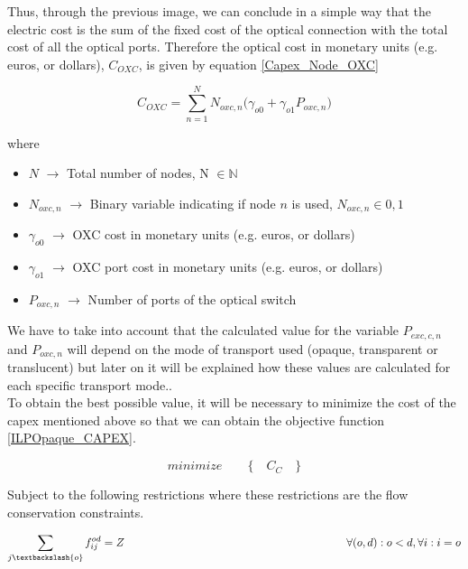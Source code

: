 Thus, through the previous image, we can conclude in a simple way that the electric cost is the sum of the fixed cost of the optical connection with the total cost of all the optical ports.
Therefore the optical cost in monetary units (e.g. euros, or dollars), $C_{OXC}$, is given by equation \ref{Capex_Node_OXC}

\begin{equation}
C_{OXC} = \sum_{n=1}^{N} N_{oxc,n} \bigg( \gamma_{o0} + \gamma_{o1} P_{oxc,n} \bigg)
\label{Capex_Node_OXC}
\end{equation}

where
\begin{itemize}
\item{$N$				$\rightarrow$	Total number of nodes, N $\in \mathbb{N}$}
\item{$N_{oxc,n}$		$\rightarrow$	Binary variable indicating if node $n$ is used, $N_{oxc,n} \in {0, 1}$}
\item{$\gamma_{o0}$ 	$\rightarrow$	OXC cost in monetary units (e.g. euros, or dollars)}
\item{$\gamma_{o1}$ 	$\rightarrow$	OXC port cost in monetary units (e.g. euros, or dollars) }
\item{$P_{oxc,n}$	    $\rightarrow$	Number of ports of the optical switch}
\end{itemize}


\vspace{10pt}
We have to take into account that the calculated value for the variable $P_{exc,c,n}$ and $P_{oxc,n}$ will depend on the mode of transport used (opaque, transparent or translucent) but later on it will be explained how these values are calculated for each specific transport mode..\\

To obtain the best possible value, it will be necessary to minimize the cost of the capex mentioned above so that we can obtain the objective function \ref{ILPOpaque_CAPEX}.

\begin{equation}
minimize \qquad \Big\{ \quad C_C \quad \Big\}
\label{ILPOpaque_CAPEX}
\end{equation}

\vspace{11pt}
Subject to the following restrictions where these restrictions are the flow conservation constraints.

\begin{equation}
\sum_{j\textbackslash \{o\}} f_{ij}^{od} = Z  \qquad \qquad \qquad \qquad \qquad \qquad \qquad \qquad \qquad \qquad
\forall(o,d) : o < d, \forall i: i = o
\label{ILPOpaque1_CAPEX}
\end{equation}

